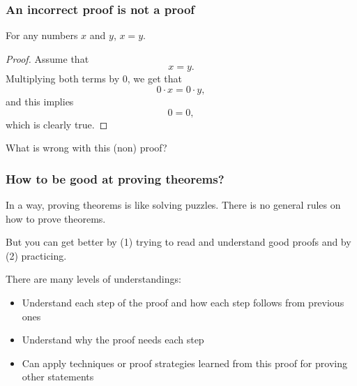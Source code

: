 \begin{frame}\frametitle{An incorrect proof is not a proof}
  \begin{theorem}
    For any numbers $x$ and $y$, $x = y$.
  \end{theorem}
  \pause

  \begin{proof}
    Assume that
    \[ x = y. \] \pause
    Multiplying both terms by 0, we get that
    \[ 0\cdot x = 0\cdot y, \] \pause
    and this implies
    \[ 0 = 0, \]
    which is clearly true.
  \end{proof}

  \pause

  What is wrong with this (non) proof?
\end{frame}

\begin{frame}\frametitle{How to be good at proving theorems?}
  In a way, proving theorems is like solving puzzles.  There is no
  general rules on how to prove theorems.

  \pause
  But you can get better by (1) trying to read and understand good
  proofs and by (2) practicing.

  \pause
  \vspace{0.2in}
  
  There are many levels of understandings:
  \pause
  
  \begin{itemize}
  \item Understand each step of the proof and how each step follows
    from previous ones
    \pause
  \item Understand why the proof needs each step
    \pause
  \item Can apply techniques or proof strategies learned from this
    proof for proving other statements
  \end{itemize}
\end{frame}
